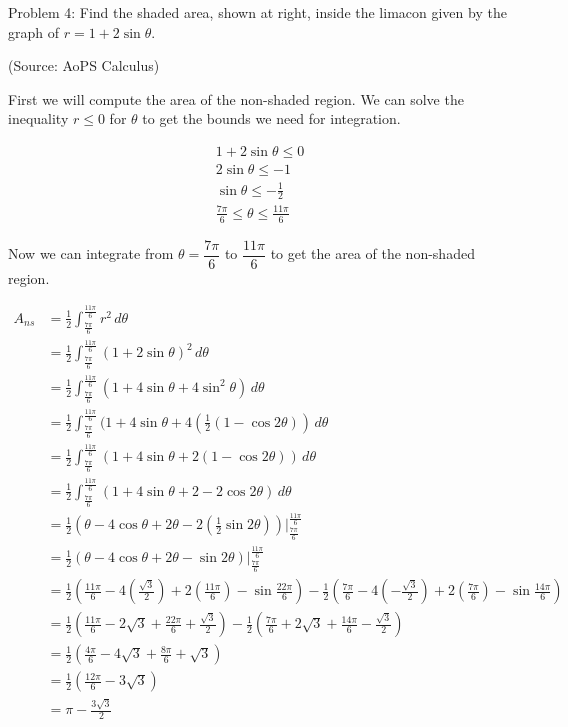 Problem 4: Find the shaded area, shown at right, inside the limacon given by the graph of $r = 1 + 2 \sin \theta$.

(Source: AoPS Calculus)

First we will compute the area of the non-shaded region. We can solve the inequality $r \leq 0$ for $\theta$ to get the bounds we need for integration.

\begin{align*}
1 + 2 \sin \theta \leq 0 \\
2 \sin \theta \leq -1 \\
\sin \theta \leq -\frac{1}{2} \\
\frac{7\pi}{6} \leq \theta \leq \frac{11\pi}{6}
\end{align*}

Now we can integrate from $\theta = \dfrac{7\pi}{6}$ to $\dfrac{11\pi}{6}$ to get the area of the non-shaded region.

\begin{align*}
A_{ns} &= \frac{1}{2} \int_{\frac{7\pi}{6}}^{\frac{11\pi}{6}} r^2 \, d\theta \\ 
&= \frac{1}{2} \int_{\frac{7\pi}{6}}^{\frac{11\pi}{6}} (1 + 2 \sin \theta)^2 \, d\theta \\ 
&= \frac{1}{2} \int_{\frac{7\pi}{6}}^{\frac{11\pi}{6}} (1 + 4 \sin \theta + 4 \sin ^2 \theta) \, d\theta \\ 
&= \frac{1}{2} \int_{\frac{7\pi}{6}}^{\frac{11\pi}{6}} (1 + 4 \sin \theta + 4(\frac{1}{2}(1 - \cos 2\theta)) \, d\theta \\ 
&= \frac{1}{2} \int_{\frac{7\pi}{6}}^{\frac{11\pi}{6}} (1 + 4 \sin \theta + 2(1 - \cos 2\theta)) \, d\theta \\ 
&= \frac{1}{2} \int_{\frac{7\pi}{6}}^{\frac{11\pi}{6}} (1 + 4 \sin \theta + 2 - 2 \cos 2\theta) \, d\theta \\ 
&= \frac{1}{2} \left(\theta - 4 \cos \theta + 2\theta - 2 (\frac{1}{2} \sin 2\theta) \right) \Bigg|_{\frac{7\pi}{6}}^{\frac{11\pi}{6}} \\ 
&= \frac{1}{2} \left(\theta - 4 \cos \theta + 2\theta - \sin 2\theta \right) \Bigg|_{\frac{7\pi}{6}}^{\frac{11\pi}{6}} \\ 
&= \frac{1}{2} \left(\frac{11\pi}{6}- 4(\frac{\sqrt 3}{2}) + 2(\frac{11\pi}{6}) - \sin \frac{22\pi}{6} \right) - \frac{1}{2} \left(\frac{7\pi}{6}- 4(-\frac{\sqrt 3}{2}) + 2(\frac{7\pi}{6}) - \sin \frac{14\pi}{6} \right) \\
&= \frac{1}{2} \left(\frac{11\pi}{6} - 2\sqrt{3} + \frac{22\pi}{6} + \frac{\sqrt3}{2} \right) - \frac{1}{2} \left(\frac{7\pi}{6} + 2\sqrt{3} + \frac{14\pi}{6} - \frac{\sqrt 3}{2} \right) \\ 
&= \frac{1}{2} \left(\frac{4\pi}{6} - 4\sqrt{3} + \frac{8\pi}{6} + \sqrt 3 \right) \\
&= \frac{1}{2} \left(\frac{12\pi}{6} - 3\sqrt{3} \right) \\
&= \pi - \frac{3 \sqrt 3}{2}
\end{align*}

